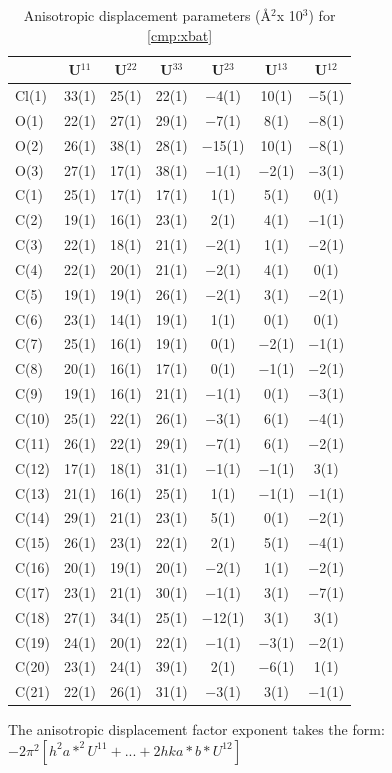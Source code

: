 \onecolumn
\begin{table}[h]
\centering
\caption{Anisotropic displacement parameters (\AA$^2$x 10$^3$) for \ref{cmp:xbat}} 
\footnotesize
\begin{tabular}{p{1in}cccccc} 
\toprule
& U$^{11}$ & U$^{22}$ & U$^{33}$ & U$^{23}$ & U$^{13}$ & U$^{12}$ \\
\midrule
Cl(1)&33(1) &25(1)&22(1) &$-$4(1)&10(1) &$-$5(1)\\
O(1)&22(1) &27(1)&29(1) &$-$7(1)&8(1) &$-$8(1)\\
O(2)&26(1) &38(1)&28(1) &$-$15(1)&10(1) &$-$8(1)\\
O(3)&27(1) &17(1)&38(1) &$-$1(1)&$-$2(1) &$-$3(1)\\
C(1)&25(1) &17(1)&17(1) &1(1)&5(1) &0(1)\\
C(2)&19(1) &16(1)&23(1) &2(1)&4(1) &$-$1(1)\\
C(3)&22(1) &18(1)&21(1) &$-$2(1)&1(1) &$-$2(1)\\
C(4)&22(1) &20(1)&21(1) &$-$2(1)&4(1) &0(1)\\
C(5)&19(1) &19(1)&26(1) &$-$2(1)&3(1) &$-$2(1)\\
C(6)&23(1) &14(1)&19(1) &1(1)&0(1) &0(1)\\
C(7)&25(1) &16(1)&19(1) &0(1)&$-$2(1) &$-$1(1)\\
C(8)&20(1) &16(1)&17(1) &0(1)&$-$1(1) &$-$2(1)\\
C(9)&19(1) &16(1)&21(1) &$-$1(1)&0(1) &$-$3(1)\\
C(10)&25(1) &22(1)&26(1) &$-$3(1)&6(1) &$-$4(1)\\
C(11)&26(1) &22(1)&29(1) &$-$7(1)&6(1) &$-$2(1)\\
C(12)&17(1) &18(1)&31(1) &$-$1(1)&$-$1(1) &3(1)\\
C(13)&21(1) &16(1)&25(1) &1(1)&$-$1(1) &$-$1(1)\\
C(14)&29(1) &21(1)&23(1) &5(1)&0(1) &$-$2(1)\\
C(15)&26(1) &23(1)&22(1) &2(1)&5(1) &$-$4(1)\\
C(16)&20(1) &19(1)&20(1) &$-$2(1)&1(1) &$-$2(1)\\
C(17)&23(1) &21(1)&30(1) &$-$1(1)&3(1) &$-$7(1)\\
C(18)&27(1) &34(1)&25(1) &$-$12(1)&3(1) &3(1)\\
C(19)&24(1) &20(1)&22(1) &$-$1(1)&$-$3(1) &$-$2(1)\\
C(20)&23(1) &24(1)&39(1) &2(1)&$-$6(1) &1(1)\\
C(21)&22(1) &26(1)&31(1) &$-$3(1)&3(1) &$-$1(1)\\
\bottomrule
\end{tabular}
\end{table}
{ \footnotesize
The anisotropic displacement factor exponent takes the form: 
$-2\pi^2\left[ h^2a*^2U^{11} + ... + 2 h k a* b* U^{12} \right]$ }

